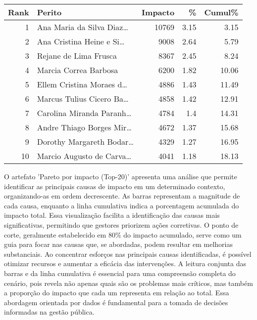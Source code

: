 \documentclass[11pt]{article}
\begin{document}
\begingroup\scriptsize
\begin{center}
\begin{tabular}{rlrrr}
Rank & Perito & Impacto & \% & Cumul\%\\
\hline
1 & Ana Maria da Silva Diaz… & 10769 & 3.15 & 3.15\\
2 & Ana Cristina Heine e Si… & 9008 & 2.64 & 5.79\\
3 & Rejane de Lima Frusca & 8367 & 2.45 & 8.24\\
4 & Marcia Correa Barbosa & 6200 & 1.82 & 10.06\\
5 & Ellem Cristina Moraes d… & 4886 & 1.43 & 11.49\\
6 & Marcus Tulius Cicero Ba… & 4858 & 1.42 & 12.91\\
7 & Carolina Miranda Paranh… & 4784 & 1.4 & 14.31\\
8 & Andre Thiago Borges Mir… & 4672 & 1.37 & 15.68\\
9 & Dorothy Margareth Bodar… & 4329 & 1.27 & 16.95\\
10 & Marcio Augusto de Carva… & 4041 & 1.18 & 18.13\\
\end{tabular}
\end{center}
\endgroup
O artefato 'Pareto por impacto (Top-20)' apresenta uma análise que permite identificar as principais causas de impacto em um determinado contexto, organizando-as em ordem decrescente. As barras representam a magnitude de cada causa, enquanto a linha cumulativa indica a porcentagem acumulada do impacto total. Essa visualização facilita a identificação das causas mais significativas, permitindo que gestores priorizem ações corretivas. O ponto de corte, geralmente estabelecido em 80\% do impacto acumulado, serve como um guia para focar nas causas que, se abordadas, podem resultar em melhorias substanciais. Ao concentrar esforços nas principais causas identificadas, é possível otimizar recursos e aumentar a eficácia das intervenções. A leitura conjunta das barras e da linha cumulativa é essencial para uma compreensão completa do cenário, pois revela não apenas quais são os problemas mais críticos, mas também a proporção do impacto que cada um representa em relação ao total. Essa abordagem orientada por dados é fundamental para a tomada de decisões informadas na gestão pública.
\end{document}
